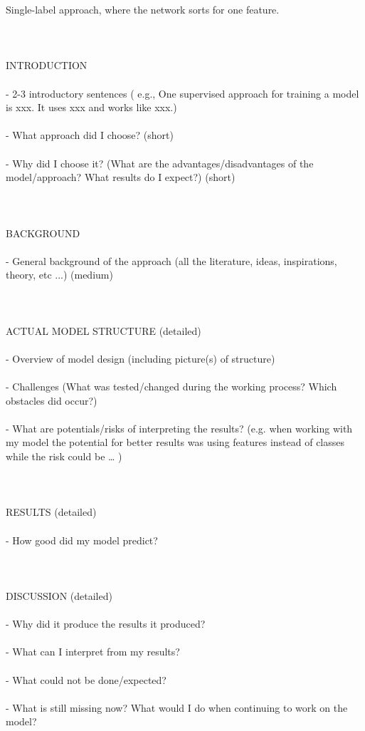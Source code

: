Single-label approach, where the network sorts for one feature. \\
\\
\\
\\
INTRODUCTION \\
\\ 
- 2-3 introductory sentences ( e.g., One supervised approach for training a model is xxx. It uses xxx and works like xxx.) \\
\\
- What approach did I choose? (short) \\
\\
- Why did I choose it? (What are the advantages/disadvantages of the model/approach? What results do I expect?) (short) \\
\\
\\
\\
BACKGROUND \\
\\
- General background of the approach (all the literature, ideas, inspirations, theory, etc ...) (medium) \\
\\
\\
\\
ACTUAL MODEL STRUCTURE (detailed) \\
\\
- Overview of model design (including picture(s) of structure) \\
\\
- Challenges (What was tested/changed during the working process? Which obstacles did occur?) \\
\\
- What are potentials/risks of interpreting the results? (e.g. when working with my model the potential for better results was using features instead of classes while the risk could be … ) \\
\\
\\
\\
RESULTS (detailed) \\
\\
- How good did my model predict? \\
\\
\\
\\
DISCUSSION (detailed) \\
\\
- Why did it produce the results it produced? \\
\\
- What can I interpret from my results? \\
\\
- What could not be done/expected? \\
\\
- What is still missing now? What would I do when continuing to work on the model? \\
\\

